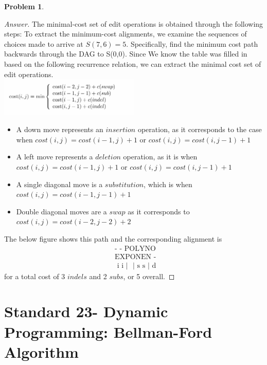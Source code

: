 \documentclass[11pt]{article}
\theoremstyle{definition}
\theoremstyle{definition}
\newtheorem{required}{Problem}
\theoremstyle{definition}
\begin{document}
\begin{required}
\begin{proof}[Answer]
The minimal-cost set of edit operations is obtained through the following steps: 
To extract the minimum-cost alignments, we examine the sequences of choices made to arrive at $S(7,6)= 5$. Specifically, find the minimum cost path backwards through the DAG to S(0,0). Since We know the table was filled in based on the following recurrence relation, we can extract the minimal cost set of edit operations.\\
\includegraphics[width=0.5\textwidth]{hw8recur} \\
\begin{itemize}
\item A down move represents an $insertion$ operation, as it corresponds to the case when $cost(i,j)=cost(i-1,j)+1$ or $cost(i,j)=cost(i,j-1)+1$ 
\item A left move represents a $deletion$ operation, as it is when $cost(i,j)=cost(i-1,j)+1$ or $cost(i,j)=cost(i,j-1)+1$ 
\item A single diagonal move is a $substitution$, which is when $cost(i,j)=cost(i-1,j-1)+1$
\item Double diagonal moves are a $swap$ as it corresponds to $cost(i,j)=cost(i-2,j-2)+2$
\end{itemize}
The below figure shows this path and the corresponding alignment is 
\begin{align*}
&\text{- - POLYNO} \\
&\text{EXPONEN - }\\
&\text{ i   i }| \text{        } | \text{  s    s  }|\text{  d }
\end{align*}
for a total cost of 3 $indels$ and 2 $subs$, or 5 overall. 


\end{proof}

\end{required}

\newpage
\section{Standard 23- Dynamic Programming: Bellman-Ford Algorithm}
\end{document}
